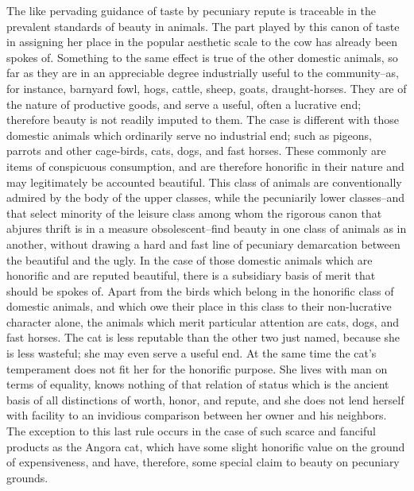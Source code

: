 \documentclass[12pt]{report}
\begin{document}
The like pervading guidance of taste by pecuniary repute is traceable
in the prevalent standards of beauty in animals. The part played by this
canon of taste in assigning her place in the popular aesthetic scale to
the cow has already been spokes of. Something to the same effect is
true of the other domestic animals, so far as they are in an appreciable
degree industrially useful to the community--as, for instance, barnyard
fowl, hogs, cattle, sheep, goats, draught-horses. They are of the
nature of productive goods, and serve a useful, often a lucrative end;
therefore beauty is not readily imputed to them. The case is different
with those domestic animals which ordinarily serve no industrial end;
such as pigeons, parrots and other cage-birds, cats, dogs, and fast
horses. These commonly are items of conspicuous consumption, and are
therefore honorific in their nature and may legitimately be accounted
beautiful. This class of animals are conventionally admired by the body
of the upper classes, while the pecuniarily lower classes--and that
select minority of the leisure class among whom the rigorous canon that
abjures thrift is in a measure obsolescent--find beauty in one class of
animals as in another, without drawing a hard and fast line of pecuniary
demarcation between the beautiful and the ugly. In the case of those
domestic animals which are honorific and are reputed beautiful, there
is a subsidiary basis of merit that should be spokes of. Apart from the
birds which belong in the honorific class of domestic animals, and which
owe their place in this class to their non-lucrative character alone,
the animals which merit particular attention are cats, dogs, and fast
horses. The cat is less reputable than the other two just named, because
she is less wasteful; she may even serve a useful end. At the same time
the cat's temperament does not fit her for the honorific purpose. She
lives with man on terms of equality, knows nothing of that relation of
status which is the ancient basis of all distinctions of worth, honor,
and repute, and she does not lend herself with facility to an invidious
comparison between her owner and his neighbors. The exception to this
last rule occurs in the case of such scarce and fanciful products as
the Angora cat, which have some slight honorific value on the ground
of expensiveness, and have, therefore, some special claim to beauty on
pecuniary grounds.
\end{document}
